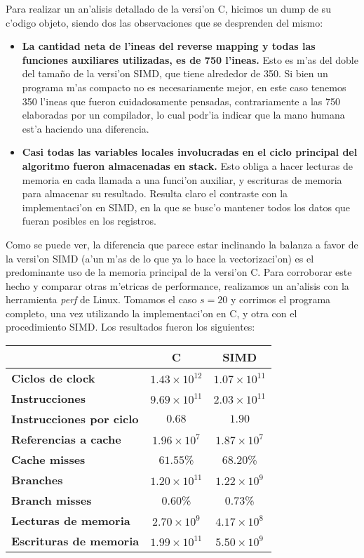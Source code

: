 Para realizar un an'alisis detallado de la versi'on C, hicimos un dump de su c'odigo objeto, siendo dos las observaciones que se desprenden del mismo:

\begin{itemize}
	\item \textbf{La cantidad neta de l'ineas del reverse mapping y todas las funciones auxiliares utilizadas, es de 750 l'ineas.} Esto es m'as del doble del tama\~{n}o de la versi'on SIMD, que tiene alrededor de 350. Si bien un programa m'as compacto no es necesariamente mejor, en este caso tenemos 350 l'ineas que fueron cuidadosamente pensadas, contrariamente a las 750 elaboradas por un compilador, lo cual podr'ia indicar que la mano humana est'a haciendo una diferencia.
	
	\item \textbf{Casi todas las variables locales involucradas en el ciclo principal del algoritmo fueron almacenadas en stack.} Esto obliga a hacer lecturas de memoria en cada llamada a una funci'on auxiliar, y escrituras de memoria para almacenar su resultado. Resulta claro el contraste con la implementaci'on en SIMD, en la que se busc'o mantener todos los datos que fueran posibles en los registros.
\end{itemize}

Como se puede ver, la diferencia que parece estar inclinando la balanza a favor de la versi'on SIMD (a'un m'as de lo que ya lo hace la vectorizaci'on) es el predominante uso de la memoria principal de la versi'on C. Para corroborar este hecho y comparar otras m'etricas de performance, realizamos un an'alisis con la herramienta \textit{perf} de Linux. Tomamos el caso $s = 20$ y corrimos el programa completo, una vez utilizando la implementaci'on en C, y otra con el procedimiento SIMD. Los resultados fueron los siguientes:

\begin{center}
\begin{tabular}{|l|c|c|}
\hline
& \textbf{C} & \textbf{SIMD}\\
\hline
\textbf{Ciclos de clock} & $1.43 \times 10^{12}$ & $1.07 \times 10^{11}$\\
\textbf{Instrucciones} & $9.69 \times 10^{11}$ & $2.03 \times 10^{11}$\\
\textbf{Instrucciones por ciclo} & $0.68$ & $1.90$\\
\textbf{Referencias a cache} & $1.96 \times 10^{7}$ & $1.87 \times 10^{7}$\\
\textbf{Cache misses} & $61.55$\% & $68.20$\%\\
\textbf{Branches} & $1.20 \times 10^{11}$ & $1.22 \times 10^{9}$\\
\textbf{Branch misses} & $0.60$\% & $0.73$\%\\
\textbf{Lecturas de memoria} & $2.70 \times 10^{9}$ & $4.17 \times 10^{8}$\\                                                    \textbf{Escrituras de memoria} & $1.99 \times 10^{11}$ & $5.50 \times 10^{9}$\\
\hline
\end{tabular}
\end{center}

